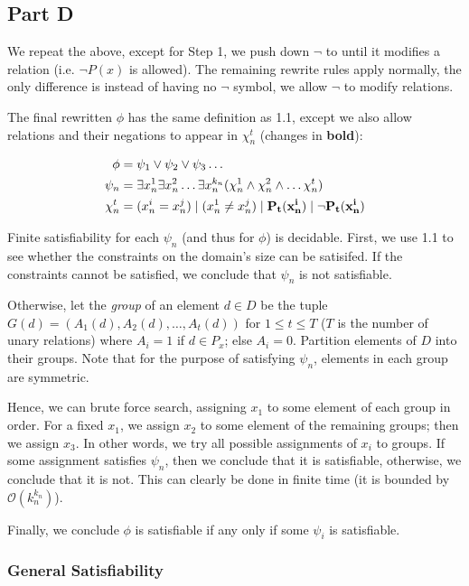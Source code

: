 \documentclass{article}
\newcommand{\BigO}{\mathcal{O}}
\begin{document}
\subsection{Part D}

We repeat the above, except for Step 1, we push down $\neg$ to until it
modifies a relation (i.e. $\neg P(x)$ is allowed). The remaining rewrite rules
apply normally, the only difference is instead of having no $\neg$ symbol, we
allow $\neg$ to modify relations.

The final rewritten $\phi$ has the same definition as 1.1, except we also allow
relations and their negations to appear in $\chi_n^t$ (changes in
\textbf{bold}):

\begin{align*}
    \phi &= \psi_1 \vee \psi_2 \vee \psi_3 \ldots \\
    \psi_n &= \exists x_n^1 \exists x_n^2 \ldots \exists x_n^{k_n} (\chi_n^1 \wedge \chi_n^2 \wedge \ldots \chi_n^t) \\
    \chi_n^t &= (x_n^i = x_n^j) \; | \; (x_n^1 \neq x_n^j) \mathbf{\; | \; P_t(x_n^i) \; | \; \neg P_t(x_n^i)}
\end{align*}

Finite satisfiability for each $\psi_n$ (and thus for $\phi$) is decidable.
First, we use 1.1 to see whether the constraints on the domain's size can be
satisifed. If the constraints cannot be satisfied, we conclude that $\psi_n$ is
not satisfiable.

Otherwise, let the \textit{group} of an element $d \in D$ be the tuple $G(d) =
(A_1(d), A_2(d), \ldots, A_t(d))$ for $1 \leq t \leq T$ ($T$ is the number of
unary relations) where $A_i = 1$ if $d \in P_x$; else $A_i = 0$. Partition
elements of $D$ into their groups. Note that for the purpose of satisfying
$\psi_n$, elements in each group are symmetric.

Hence, we can brute force search, assigning $x_1$ to some element of each group
in order. For a fixed $x_1$, we assign $x_2$ to some element of the remaining
groups; then we assign $x_3$. In other words, we try all possible assignments
of $x_i$ to groups. If some assignment satisfies $\psi_n$, then we conclude
that it is satisfiable, otherwise, we conclude that it is not. This can clearly
be done in finite time (it is bounded by $\BigO(k_n^{k_n})$).

Finally, we conclude $\phi$ is satisfiable if any only if some $\psi_i$ is
satisfiable.

\subsubsection{General Satisfiability}
\end{document}
